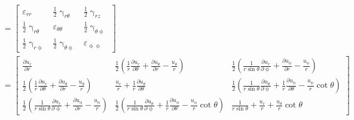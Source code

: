                 \begin{align}
                    [\varepsilon] &= \left[\begin{matrix}
                        \varepsilon_{rr} & \frac{1}{2}\upgamma_{r\theta} & \frac{1}{2}\upgamma_{rz} \\
                        \frac{1}{2}\upgamma_{r\theta} & \varepsilon_{\theta\theta} & \frac{1}{2}\upgamma_{\theta \upphi} \\
                        \frac{1}{2}\upgamma_{r\upphi} & \frac{1}{2}\upgamma_{\theta \upphi} & \varepsilon_{\upphi\upphi}
                    \end{matrix}\right] \nonumber\\
                    &= \left[\begin{matrix} 
                        \frac{\partial u_r}{\partial r} & \frac{1}{2}\left(\frac{1}{r}\frac{\partial u_r}{\partial \theta} + \frac{\partial u_{\theta}}{\partial r} - \frac{u_{\theta}}{r}\right) & \frac{1}{2}\left(\frac{1}{r\sin\theta}\frac{\partial u_r}{\partial \upphi} + \frac{\partial u_{\upphi}}{\partial r} - \frac{u_{\upphi}}{r}\right)\\
                        \frac{1}{2}\left(\frac{1}{r}\frac{\partial u_r}{\partial \theta} + \frac{\partial u_{\theta}}{\partial r} - \frac{u_{\theta}}{r}\right) & \frac{u_r}{r} + \frac{1}{r}\frac{\partial u_{\theta}}{\partial \theta} & \frac{1}{2}\left(\frac{1}{r\sin\theta}\frac{\partial u_{\theta}}{\partial \upphi} + \frac{1}{r}\frac{\partial u_{\upphi}}{\partial \theta} - \frac{u_{\upphi}}{r}\cot\theta\right)\\
                        \frac{1}{2}\left(\frac{1}{r\sin\theta}\frac{\partial u_r}{\partial \upphi} + \frac{\partial u_{\upphi}}{\partial r} - \frac{u_{\upphi}}{r}\right) & \frac{1}{2}\left(\frac{1}{r\sin\theta}\frac{\partial u_{\theta}}{\partial \upphi} + \frac{1}{r}\frac{\partial u_{\upphi}}{\partial \theta} - \frac{u_{\upphi}}{r}\cot\theta\right) & \frac{1}{r\sin\theta} + \frac{u_r}{r} + \frac{u_{\theta}}{r}\cot\theta
                    \end{matrix}\right] \nonumber
                    \label{rektensor_bol}
                \end{align}
        

